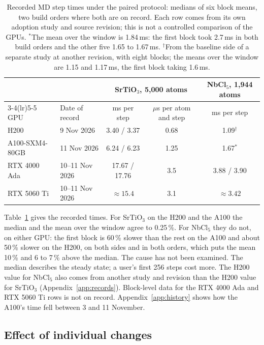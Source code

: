 \documentclass[11pt]{article}
\newcommand{\ms}{\,ms}
\begin{document}
\begin{table}[t]
\centering
\small
\begin{tabular}{llccc}
\toprule
 & & \multicolumn{2}{c}{SrTiO$_3$, 5{,}000 atoms} & NbCl$_5$, 1{,}944 atoms \\
\cmidrule(lr){3-4}\cmidrule(lr){5-5}
GPU & Date of record & ms per step & $\mu$s per atom and step & ms per step \\
\midrule
H200            & 9 Nov 2026      & 3.40 / 3.37   & 0.68 & 1.09$^{\dagger}$ \\
A100-SXM4-80GB  & 11 Nov 2026     & 6.24 / 6.23   & 1.25 & 1.67$^{\ast}$ \\
RTX 4000 Ada    & 10--11 Nov 2026 & 17.67 / 17.76 & 3.5  & 3.88 / 3.90 \\
RTX 5060 Ti     & 10--11 Nov 2026 & $\approx 15.4$ & 3.1 & $\approx 3.42$ \\
\bottomrule
\end{tabular}
\caption{Recorded MD step times under the paired protocol: medians of six block means, two build orders where
both are on record. Each row comes from its own adoption study and source revision; this is not a controlled
comparison of the GPUs. $^{\ast}$The mean over the window is 1.84\ms{}: the first block took 2.7\ms{} in both
build orders and the other five 1.65 to 1.67\ms{}. $^{\dagger}$From the baseline side of a separate study at
another revision, with eight blocks; the means over the window are 1.15 and 1.17\ms{}, the first block taking
1.6\ms{}.}
\label{tab:steps}
\end{table}

Table~\ref{tab:steps} gives the recorded times. For SrTiO$_3$ on the H200 and the A100 the median and the mean
over the window agree to 0.25\,\%. For NbCl$_5$ they do not, on either GPU: the first block is 60\,\% slower
than the rest on the A100 and about 50\,\% slower on the H200, on both sides and in both orders, which puts the
mean 10\,\% and 6 to 7\,\% above the median. The cause has not been examined. The median describes the steady
state; a user's first 256 steps cost more. The H200 value for NbCl$_5$ also comes from another study and
revision than the H200 value for SrTiO$_3$ (Appendix~\ref{app:records}). Block-level data for the RTX 4000 Ada and RTX
5060 Ti rows is not on record. Appendix~\ref{app:history} shows how the A100's time fell between 3 and
11 November.

\subsection{Effect of individual changes}
\end{document}

